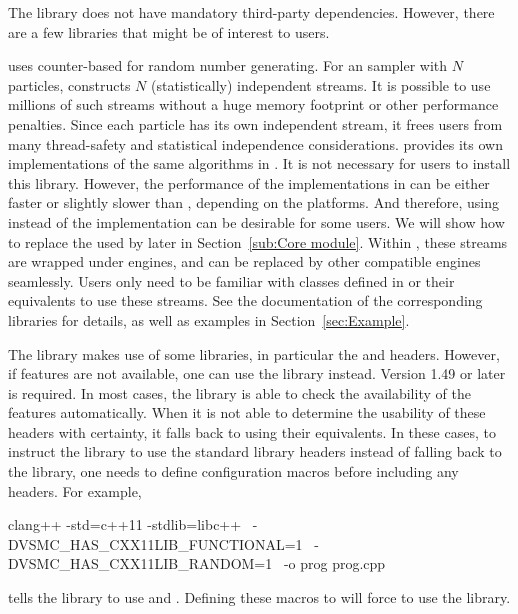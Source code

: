 \documentclass[11pt, fontset=Minion, showoverfull,
bib, biblatexstyle=numeric, mintcode, minted=cache]{marticle}
\begin{document}
The library does not have mandatory third-party dependencies. However, there
are a few libraries that might be of interest to users.

\vsmc uses \crandom counter-based \rng for random number generating. For an
\smc sampler with $N$ particles, \vsmc constructs $N$ (statistically)
independent \rng streams. It is possible to use millions of such streams
without a huge memory footprint or other performance penalties. Since each
particle has its own independent \rng stream, it frees users from many
thread-safety and statistical independence considerations. \vsmc provides its
own implementations of the same algorithms in \random. It is not necessary for
users to install this library. However, the performance of the implementations
in \vsmc can be either faster or slightly slower than \random, depending on
the platforms. And therefore, using \random instead of the \vsmc
implementation can be desirable for some users. We will show how to replace
the \rng used by \vsmc later in Section~\ref{sub:Core module}. Within \vsmc,
these \rng streams are wrapped under \cppoo \rng engines, and can be replaced
by other compatible \rng engines seamlessly. Users only need to be familiar
with classes defined in \cppoo{}  or their \cboost
equivalents to use these \rng streams. See the documentation of the
corresponding libraries for details, as well as examples in
Section~\ref{sec:Example}.

The library makes use of some \cppoo libraries, in particular the
 and  headers. However, if \cppoo
features are not available, one can use the \boost library instead. Version
1.49 or later is required. In most cases, the library is able to check the
availability of the \cppoo features automatically. When it is not able to
determine the usability of these \cppoo headers with certainty, it falls back
to using their \boost equivalents. In these cases, to instruct the library to
use the standard library headers instead of falling back to the \boost
library, one needs to define configuration macros before including any \vsmc
headers. For example,
\begin{shcode}
clang++ -std=c++11 -stdlib=libc++        \
        -DVSMC_HAS_CXX11LIB_FUNCTIONAL=1 \
        -DVSMC_HAS_CXX11LIB_RANDOM=1     \
        -o prog prog.cpp
\end{shcode}
tells the library to use \cppoo{}  and
\cppinline{<random>}.  Defining these macros to  will force \vsmc
to use the \boost library.
\end{document}
